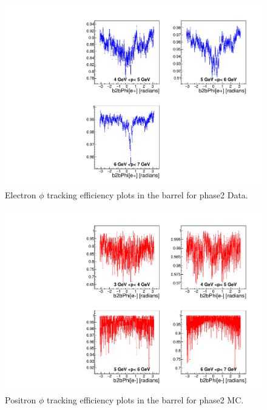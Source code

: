 \documentclass[a4paper,11pt,twosided,final,german,openbib,pdftex,listof=totoc,bibliography=totoc]{scrbook}
\begin{document}
\begin{appendix}
\begin{figure}[!htbp]
	\centering
	\includegraphics[width=\textwidth]{Plots/master/xPMPhiemBarrel_Data}
	\caption[Momentum $\phi$ Electron Barrel Efficiency Phase2 Data]{Electron $\phi$ tracking efficiency plots in the barrel for phase2 Data.}
	\label{plt:PMPhiemBarrel_Data}
\end{figure}






\begin{figure}[!htbp]
	\centering
	\includegraphics[width=\textwidth]{Plots/master/xPMPhiepBarrel_MC}
	\caption[Momentum $\phi$ Positron Barrel Efficiency Phase2 MC]{Positron $\phi$ tracking efficiency plots in the barrel for phase2 MC.}
	\label{plt:PMPhiepBarrel_MC}
\end{figure}



\end{appendix}
\end{document}
